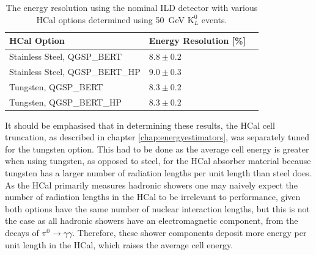 \begin{table}[h!]
\centering
\begin{tabular}{ l l l }
\hline
HCal Option & Energy Resolution [\%] \\
\hline
Stainless Steel, QGSP\_BERT & $8.8\pm0.2$ \\
Stainless Steel, QGSP\_BERT\_HP & $9.0\pm0.3$ \\
Tungsten, QGSP\_BERT & $8.3\pm0.2$ \\
Tungsten, QGSP\_BERT\_HP & $8.3\pm0.2$ \\
\hline
\end{tabular}
\caption[The energy resolution using the nominal ILD detector with various HCal options determined using 50~GeV $\text{K}^{0}_{L}$ events.]{The energy resolution using the nominal ILD detector with various HCal options determined using 50~GeV $\text{K}^{0}_{L}$ events.}
\label{table:erhcalabsmaterial}
\end{table}

It should be emphasised that in determining these results, the HCal cell truncation, as described in chapter \ref{chap:energyestimators}, was separately tuned for the tungsten option.  This had to be done as the average cell energy is greater when using tungsten, as opposed to steel, for the HCal absorber material because tungsten has a larger number of radiation lengths per unit length than steel does.  As the HCal primarily measures hadronic showers one may naively expect the number of radiation lengths in the HCal to be irrelevant to performance, given both options have the same number of nuclear interaction lengths, but this is not the case as all hadronic showers have an electromagnetic component, from the decays of $\pi^{0}\rightarrow \gamma \gamma$.  Therefore, these shower components deposit more energy per unit length in the HCal, which raises the average cell energy.  


